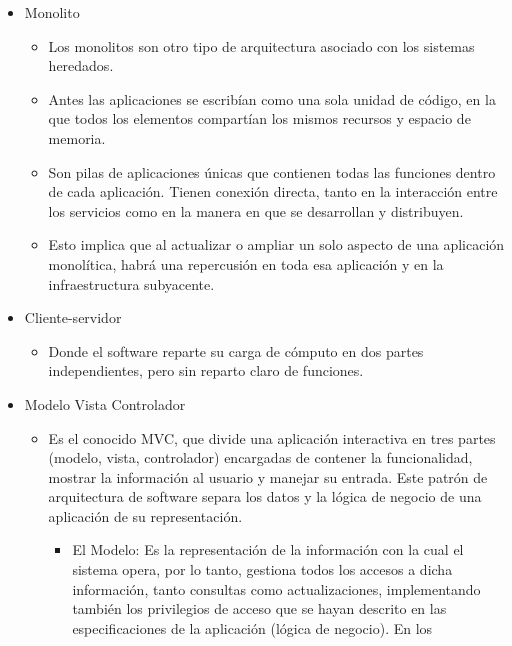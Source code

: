 \documentclass[12pt, twoside, openright]{report} %
\begin{document}
\begin{itemize}
	\item Monolito
	      \begin{itemize}
		      \item Los monolitos son otro tipo de arquitectura asociado con los
		            sistemas heredados.
		      \item Antes las aplicaciones se escribían como una sola unidad de
		            código, en la que todos los elementos compartían los mismos
		            recursos y espacio de memoria.
		      \item Son pilas de aplicaciones únicas que contienen todas las funciones
		            dentro de cada aplicación. Tienen conexión directa, tanto en la
		            interacción entre los servicios como en la manera en que se
		            desarrollan y distribuyen.
		      \item Esto implica que al actualizar o ampliar un solo aspecto de una
		            aplicación monolítica, habrá una repercusión en toda esa
		            aplicación y en la infraestructura subyacente.
	      \end{itemize}
	\item Cliente-servidor
	      \begin{itemize}
		      \item Donde el software reparte su carga de cómputo en dos partes
		            independientes, pero sin reparto claro de funciones.
	      \end{itemize}
	\item Modelo Vista Controlador
	      \begin{itemize}
		      \item Es el conocido MVC, que divide una aplicación interactiva en tres
		            partes (modelo, vista, controlador) encargadas de contener la
		            funcionalidad, mostrar la información al usuario y manejar su
		            entrada. Este patrón de arquitectura de software separa los datos
		            y la lógica de negocio de una aplicación de su representación.
		            \begin{itemize}
			            \item El Modelo: Es la representación de la información con la cual el
			                  sistema opera, por lo tanto, gestiona todos los accesos a dicha
			                  información, tanto consultas como actualizaciones, implementando
			                  también los privilegios de acceso que se hayan descrito en las
			                  especificaciones de la aplicación (lógica de negocio). En los

\end{itemize}
\end{itemize}
\end{itemize}
\end{document}
